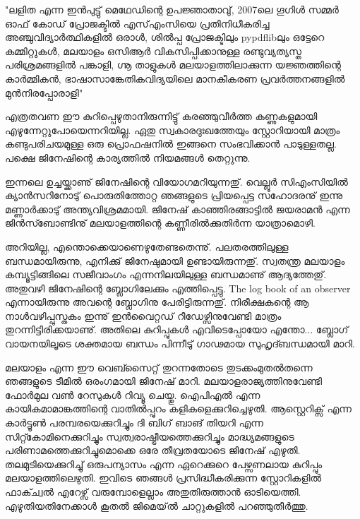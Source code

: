 ﻿
{\vskip 2pt}

\begin{framed}
"ലളിത എന്ന ഇന്‍പുട്ടു് മെഥേഡിന്റെ ഉപജ്ഞാതാവു്, 2007ലെ ഗൂഗിള്‍ സമ്മര്‍ ഓഫ് കോഡ് പ്രോജക്ടില്‍ എസ്എംസിയെ 
പ്രതിനിധീകരിച്ച അഞ്ചുവിദ്യാര്‍ത്ഥികളില്‍ ഒരാള്‍, ശില്‍പ്പ പ്രോജക്ടിലും pypdflibലും ഒട്ടേറെ കമ്മിറ്റുകള്‍, മലയാളം ഒസിആര്‍ 
വികസിപ്പിക്കാനുള്ള രണ്ടുവ്യത്യസ്ത പരിശ്രമങ്ങളില്‍ പങ്കാളി, ഗ്നൂ താളുകള്‍ മലയാളത്തിലാക്കുന്ന യജ്ഞത്തിന്റെ കാര്‍മ്മികന്‍, 
ഭാഷാസാങ്കേതികവിദ്യയിലെ മാനകീകരണ പ്രവര്‍ത്തനങ്ങളില്‍ മുന്‍നിരപ്പോരാളി"
\end{framed}

{\vskip 12pt}

എത്രതവണ ഈ കുറിപ്പെഴുതാനിരുന്നിട്ടു് കരഞ്ഞുവീര്‍ത്ത കണ്ണുകളുമായി എഴുന്നേറ്റുപോയെന്നറിയില്ല. ഏതു സ്വകാരദുഃഖത്തേയും
സ്റ്റോറിയായി മാത്രം കണ്ടുപരിചയമുള്ള ഒരു പ്രൊഫഷനില്‍ ഇങ്ങനെ സംഭവിക്കാന്‍ പാടുള്ളതല്ല. പക്ഷെ ജിനേഷിന്റെ കാര്യത്തില്‍ നിയമങ്ങള്‍ തെറ്റുന്നു.

ഇന്നലെ ഉച്ചയ്ക്കാണു് ജിനേഷിന്റെ വിയോഗമറിയുന്നതു്. വെല്ലൂര്‍ സിഎംസിയില്‍ ക്യാന്‍സറിനോടു് പൊരുതിത്തോറ്റ ഞങ്ങളുടെ 
പ്രിയപ്പെട്ട സഹോദരനു് ഇന്നു മണ്ണാര്‍ക്കാടു് അന്ത്യവിശ്രമമായി. ജിനേഷ് കാഞ്ഞിരങ്ങാട്ടില്‍ ജയരാമന്‍ എന്ന ജിന്‍സ്ബോണ്ടിനു്
മലയാളത്തിന്റെ കണ്ണീരില്‍ക്കുതിര്‍ന്ന യാത്രാമൊഴി.

അറിയില്ല, എന്തൊക്കെയാണെഴുതേണ്ടതെന്നു്. പലതരത്തിലുള്ള ബന്ധമായിരുന്നു, എനിക്കു് ജിനേഷുമായി ഉണ്ടായിരുന്നതു്. 
സ്വതന്ത്ര മലയാളം കമ്പ്യൂട്ടിങ്ങിലെ സജീവാംഗം എന്നനിലയിലുള്ള ബന്ധമാണു് ആദ്യത്തേതു്. അതുവഴി ജിനേഷിന്റെ 
ബ്ലോഗിലേക്കും എത്തിപ്പെട്ടു. The log book of an observer എന്നായിരുന്നു അവന്റെ ബ്ലോഗിനു പേരിട്ടിരുന്നതു്. നിരീക്ഷകന്റെ 
ആ നാള്‍വഴിപ്പുസ്തകം ഇന്നു് ഇന്‍വൈറ്റഡ് റീഡേഴ്സിനുവേണ്ടി മാത്രം തുറന്നിട്ടിരിക്കയാണു്. അതിലെ കുറിപ്പുകള്‍ 
എവിടെപ്പോയോ എന്തോ... ബ്ലോഗ് വായനയിലൂടെ ശക്തമായ ബന്ധം പിന്നീടു് ഗാഢമായ സുഹൃദ്ബന്ധമായി മാറി.

മലയാളം എന്ന ഈ വെബ്സൈറ്റ് തുറന്നതോടെ തുടക്കംമുതല്‍തന്നെ ഞങ്ങളുടെ ടീമില്‍ ഒരംഗമായി ജിനേഷ് മാറി. 
മലയാളരാജ്യത്തിനുവേണ്ടി ഫോര്‍മുല വണ്‍ റേസുകള്‍ റിവ്യൂ ചെയ്തു. ഐപിഎല്‍ എന്ന കായികമാമാങ്കത്തിന്റെ വാതില്‍പ്പുറം 
കളികളെക്കുറിച്ചെഴുതി. ആസ്റ്റെറിക്സ് എന്ന കാര്‍ട്ടൂണ്‍ പരമ്പരയെക്കുറിച്ചും ദി ബിഗ് ബാങ് തിയറി എന്ന സിറ്റ്കോമിനെക്കുറിച്ചും 
സ്വത്വരാഷ്ട്രീയത്തെക്കുറിച്ചും മാദ്ധ്യമങ്ങളുടെ പരിണാമത്തെക്കുറിച്ചുമൊക്കെ ഒരേ തീവ്രതയോടെ ജിനേഷ് എഴുതി. തലമുടിയെക്കുറിച്ചു് 
ഒരുപന്യാസം എന്ന ഏറെക്കുറെ പേഴ്സണലായ കുറിപ്പും മലയാളത്തിലെഴുതി. ഇവിടെ ഞങ്ങള്‍ പ്രസിദ്ധീകരിക്കുന്ന സ്റ്റോറികളില്‍ 
ഫാക്ച്വല്‍ എറേഴ്സ് വരുമ്പോളെല്ലാം അതുതിരുത്താന്‍ ഓടിയെത്തി. എഴുതിയതിനേക്കാള്‍ കൂതല്‍ ജിമെയ്ല്‍ ചാറ്റുകളില്‍ 
പറഞ്ഞുതീര്‍ത്തു.

